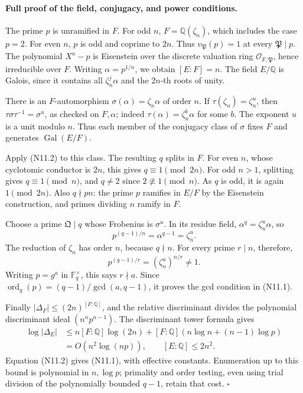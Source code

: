 \documentclass[11pt,a4paper]{article}
\begin{document}
\paragraph{Full proof of the field, conjugacy, and power conditions.}
The prime \(p\) is unramified in \(F\).
For odd \(n\), \(F=\mathbb Q(\zeta_n)\), which includes the case \(p=2\).
For even \(n\), \(p\) is odd and coprime to \(2n\).
Thus \(v_{\mathfrak P}(p)=1\) at every \(\mathfrak P\mid p\).
The polynomial \(X^n-p\) is Eisenstein over the discrete valuation ring
\(\mathcal O_{F,\mathfrak P}\), hence irreducible over \(F\).
Writing \(\alpha=p^{1/n}\), we obtain \([E:F]=n\).
The field \(E/\mathbb Q\) is Galois, since it contains all
\(\zeta_n^j\alpha\) and the \(2n\)-th roots of unity.

There is an \(F\)-automorphism \(\sigma(\alpha)=\zeta_n\alpha\) of order
\(n\). If \(\tau(\zeta_n)=\zeta_n^u\), then
\(\tau\sigma\tau^{-1}=\sigma^u\), as checked on \(F,\alpha\);
indeed \(\tau(\alpha)=\zeta_n^b\alpha\) for some \(b\).
The exponent \(u\) is a unit modulo \(n\). Thus each member of the
conjugacy class of \(\sigma\) fixes \(F\) and generates
\(\operatorname{Gal}(E/F)\).

Apply (N11.2) to this class. The resulting \(q\) splits in \(F\).
For even \(n\), whose cyclotomic conductor is \(2n\), this gives
\(q\equiv1\pmod{2n}\).
For odd \(n>1\), splitting gives \(q\equiv1\pmod n\), and \(q\ne2\)
since \(2\not\equiv1\pmod n\). As \(q\) is odd, it is again
\(1\pmod{2n}\). Also \(q\nmid pn\): the prime \(p\) ramifies in \(E/F\)
by the Eisenstein construction, and primes dividing \(n\) ramify in \(F\).

Choose a prime \(\mathfrak Q\mid q\) whose Frobenius is \(\sigma^u\).
In its residue field,
\(\alpha^q=\zeta_n^u\alpha\), so
\[
                    p^{(q-1)/n}=\alpha^{q-1}=\zeta_n^u .
\]
The reduction of \(\zeta_n\) has order \(n\), because \(q\nmid n\).
For every prime \(r\mid n\), therefore,
\[
                     p^{(q-1)/r}=(\zeta_n^u)^{n/r}\ne1.
\]
Writing \(p=g^a\) in \(\mathbb F_q^\times\), this says \(r\nmid a\).
Since \(\operatorname{ord}_q(p)=(q-1)/\gcd(a,q-1)\), it proves the gcd
condition in (N11.1).

Finally \(|\Delta_F|\leq(2n)^{[F:\mathbb Q]}\), and the relative
discriminant divides the polynomial discriminant ideal
\((n^np^{n-1})\). The discriminant tower formula gives
\[
 \begin{split}
 \log|\Delta_E|
 &\leq n[F:\mathbb Q]\log(2n)
       +[F:\mathbb Q](n\log n+(n-1)\log p)\\
 &=O(n^2\log(np)),\qquad [E:\mathbb Q]\leq2n^2.
 \end{split}
\]
Equation (N11.2) gives (N11.1), with effective constants.
Enumeration up to this bound is polynomial in \(n,\log p\);
primality and order testing, even using trial division of the
polynomially bounded \(q-1\), retain that cost. \(\square\)
\end{document}
